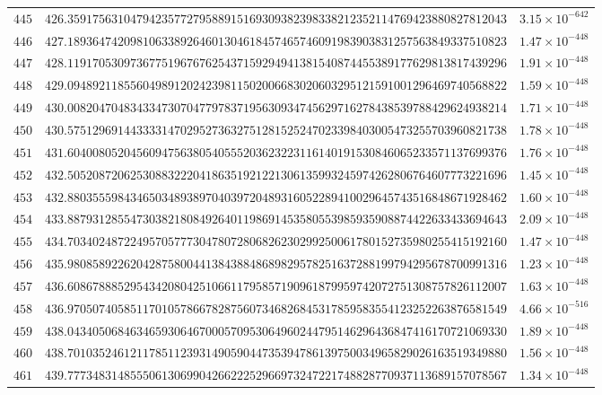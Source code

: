 \documentclass[12pt,reqno]{amsart}
\theoremstyle{remark}
\begin{document}
\begin{longtable}{clc}
$445$ & $426.3591756310479423577279588915169309382398338212352114769423880827812043$ & $3.15\times 10^{-642}$ \\
$446$ & $427.1893647420981063389264601304618457465746091983903831257563849337510823$ & $1.47\times 10^{-448}$ \\
$447$ & $428.1191705309736775196767625437159294941381540874455389177629813817439296$ & $1.91\times 10^{-448}$ \\
$448$ & $429.0948921185560498912024239811502006683020603295121591001296469740568822$ & $1.59\times 10^{-448}$ \\
$449$ & $430.0082047048343347307047797837195630934745629716278438539788429624938214$ & $1.71\times 10^{-448}$ \\
$450$ & $430.5751296914433331470295273632751281525247023398403005473255703960821738$ & $1.78\times 10^{-448}$ \\
$451$ & $431.6040080520456094756380540555203623223116140191530846065233571137699376$ & $1.76\times 10^{-448}$ \\
$452$ & $432.5052087206253088322204186351921221306135993245974262806764607773221696$ & $1.45\times 10^{-448}$ \\
$453$ & $432.8803555984346503489389704039720489316052289410029645743516848671928462$ & $1.60\times 10^{-448}$ \\
$454$ & $433.8879312855473038218084926401198691453580553985935908874422633433694643$ & $2.09\times 10^{-448}$ \\
$455$ & $434.7034024872249570577730478072806826230299250061780152735980255415192160$ & $1.47\times 10^{-448}$ \\
$456$ & $435.9808589226204287580044138438848689829578251637288199794295678700991316$ & $1.23\times 10^{-448}$ \\
$457$ & $436.6086788852954342080425106611795857190961879959742072751308757826112007$ & $1.63\times 10^{-448}$ \\
$458$ & $436.9705074058511701057866782875607346826845317859583554123252263876581549$ & $4.66\times 10^{-516}$ \\
$459$ & $438.0434050684634659306467000570953064960244795146296436847416170721069330$ & $1.89\times 10^{-448}$ \\
$460$ & $438.7010352461211785112393149059044735394786139750034965829026163519349880$ & $1.56\times 10^{-448}$ \\
$461$ & $439.7773483148555061306990426622252966973247221748828770937113689157078567$ & $1.34\times 10^{-448}$ \\

\end{longtable}
\end{document}
